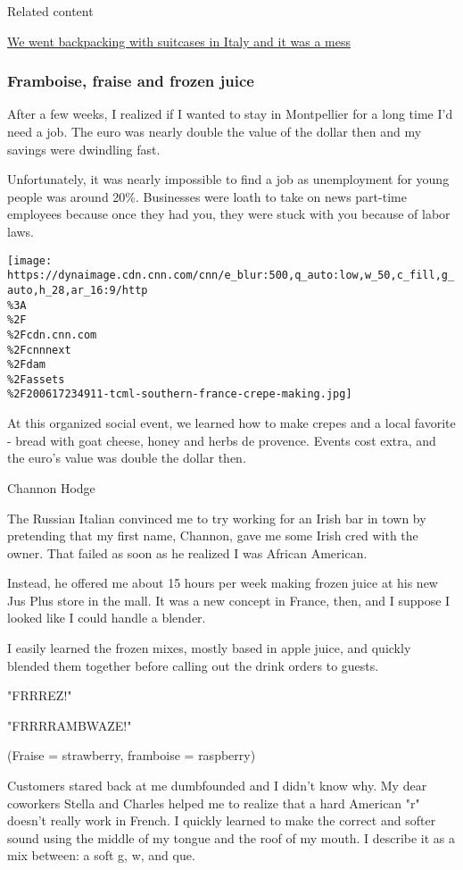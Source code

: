 Related content

\href{/travel/article/backpacking-italy-mess/index.html}{We went
backpacking with suitcases in Italy and it was a mess}

\hypertarget{framboise-fraise-and-frozen-juice}{%
\subsubsection{Framboise, fraise and frozen
juice}\label{framboise-fraise-and-frozen-juice}}

After a few weeks, I realized if I wanted to stay in Montpellier for a
long time I'd need a job. The euro was nearly double the value of the
dollar then and my savings were dwindling fast.

Unfortunately, it was nearly impossible to find a job as unemployment
for young people was around 20\%. Businesses were loath to take on news
part-time employees because once they had you, they were stuck with you
because of labor laws.

\texttt{[image: https://dynaimage.cdn.cnn.com/cnn/e\_blur:500,q\_auto:low,w\_50,c\_fill,g\_auto,h\_28,ar\_16:9/http\\\%3A\\\%2F\\\%2Fcdn.cnn.com\\\%2Fcnnnext\\\%2Fdam\\\%2Fassets\\\%2F200617234911-tcml-southern-france-crepe-making.jpg]}

At this organized social event, we learned how to make crepes and a
local favorite - bread with goat cheese, honey and herbs de provence.
Events cost extra, and the euro's value was double the dollar then.

Channon Hodge

The Russian Italian convinced me to try working for an Irish bar in town
by pretending that my first name, Channon, gave me some Irish cred with
the owner. That failed as soon as he realized I was African American.

Instead, he offered me about 15 hours per week making frozen juice at
his new Jus Plus store in the mall. It was a new concept in France,
then, and I suppose I looked like I could handle a blender.

I easily learned the frozen mixes, mostly based in apple juice, and
quickly blended them together before calling out the drink orders to
guests.

"FRRREZ!"

"FRRRRAMBWAZE!"

(Fraise = strawberry, framboise = raspberry)

Customers stared back at me dumbfounded and I didn't know why. My dear
coworkers Stella and Charles helped me to realize that a hard American
"r" doesn't really work in French. I quickly learned to make the correct
and softer sound using the middle of my tongue and the roof of my mouth.
I describe it as a mix between: a soft g, w, and que.


